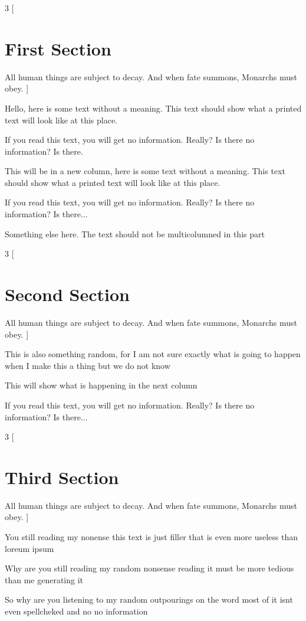 \documentclass{article}
\begin{document}
\begin{multicols}{3}
[
\section{First Section}
All human things are subject to decay. And when fate summons, Monarchs must obey.
]

Hello, here is some text without a meaning.  This text should show what 
a printed text will look like at this place.

If you read this text, you will get no information.  Really?  Is there 
no information?  Is there.

\columnbreak

This will be in a new column, here is some text without a meaning.  This text 
should show what a printed text will look like at this place.

If you read this text, you will get no information.  Really?  Is there 
no information?  Is there...
\end{multicols}

Something else here. The text should not be multicolumned in this part

\begin{multicols}{3}
[
\section{Second Section}
All human things are subject to decay. And when fate summons, Monarchs must obey.
]

This is also something random, for I am not sure exactly what is going to happen when I make this a thing
but we do not know 

\columnbreak

This will show what is happening in the next column

If you read this text, you will get no information.  Really?  Is there 
no information?  Is there...
\end{multicols}

\begin{multicols}{3}
[
\section{Third Section}
All human things are subject to decay. And when fate summons, Monarchs must obey.
]

You still reading my nonense this text is just filler that is even more useless than loreum ipsum 

\columnbreak

Why are you still reading my random nonsense reading it must be more tedious than me generating it 

So why are you listening to my random outpourings on the word most of it isnt even spellcheked and no 
no information
\end{multicols}
\end{document}
